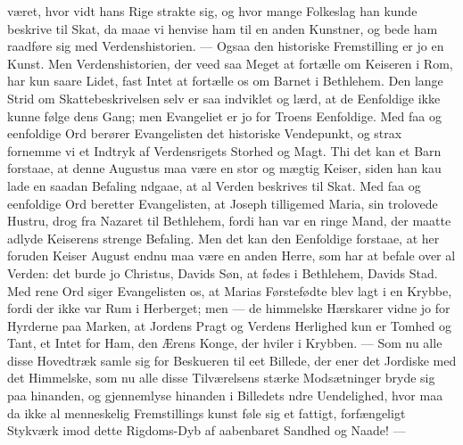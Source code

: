 \documentclass[12pt,a4paper]{book}
\begin{document}
været, hvor vidt hans Rige strakte sig, og hvor mange Folkeslag han kunde
beskrive til Skat, da maae vi henvise ham til en anden Kunstner, og bede ham
raadføre sig med Verdenshistorien. --- Ogsaa den historiske Fremstilling er jo en
Kunst. Men Verdenshistorien, der veed saa Meget at fortælle om Keiseren i Rom,
har kun saare Lidet, fast Intet at fortælle os om Barnet i Bethlehem. Den lange
Strid om Skattebeskrivelsen selv er saa indviklet og lærd, at de Eenfoldige ikke
kunne følge dens Gang; men Evangeliet er jo for Troens Eenfoldige. Med faa og
eenfoldige Ord berører Evangelisten det historiske Vendepunkt, og strax fornemme
vi et Indtryk af Verdensrigets Storhed og Magt. Thi det kan et Barn forstaae, at
denne Augustus maa være en stor og mægtig Keiser, siden han kau lade en saadan
Befaling ndgaae, at al Verden beskrives til Skat. Med faa og eenfoldige Ord
beretter Evangelisten, at Joseph tilligemed Maria, sin trolovede Hustru, drog fra
Nazaret til Bethlehem, fordi han var en ringe Mand, der maatte adlyde Keiserens
strenge Befaling. Men det kan den Eenfoldige forstaae, at her foruden Keiser
August endnu maa være en anden Herre, som har at befale over al Verden: det
burde jo Christus, Davids Søn, at fødes i Bethlehem, Davids Stad. Med rene Ord
siger Evangelisten os, at Marias Førstefødte blev lagt i en Krybbe, fordi der
ikke var Rum i Herberget; men --- de himmelske Hærskarer vidne jo for Hyrderne
paa Marken, at Jordens Pragt og Verdens Herlighed kun er Tomhed og Tant, et Intet
for Ham, den Ærens Konge, der hviler i Krybben. --- Som nu alle disse Hovedtræk
samle sig for Beskueren til eet Billede, der ener det Jordiske med det
Himmelske, som nu alle disse Tilværelsens stærke Modsætninger bryde sig paa
hinanden, og gjennemlyse hinanden i Billedets ndre Uendelighed, hvor maa da ikke
al menneskelig Fremstillings\-%
kunst føle sig et fattigt, forfængeligt Stykværk imod dette Rigdoms-Dyb af
aabenbaret Sandhed og Naade! ---
\end{document}
